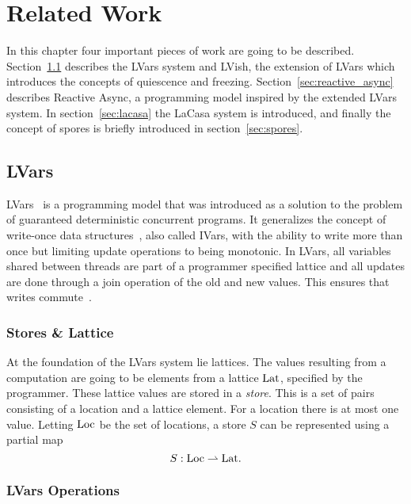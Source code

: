 \chapter{Related Work}\label{cha:related_work}

In this chapter four important pieces of work are going to be described.
Section~\ref{sec:lvars} describes the LVars system and LVish, the extension
of LVars which introduces the concepts of quiescence and freezing. 
Section~\ref{sec:reactive_async} describes Reactive Async, a programming model
inspired by the extended LVars system. In section~\ref{sec:lacasa} the LaCasa
system is introduced, and finally the concept of spores is briefly introduced in
section~\ref{sec:spores}.

\section{LVars}\label{sec:lvars}

LVars~\parencite{kuper2013lvars} is a programming model that was introduced as a
solution to the problem of guaranteed deterministic concurrent programs. It
generalizes the concept of write-once data
structures~\parencite{nikhil1989structures}, also called IVars, with the ability
to write more than once but limiting update operations to being monotonic.
In LVars, all variables shared between threads are part of a programmer
specified lattice and all updates are done through a join operation of the old
and new values. This ensures that writes commute~\parencite{kuper2013lvars}.

\subsection{Stores \& Lattice}%
\label{sub:stores_and_lattice}

At the foundation of the LVars system lie lattices. The values resulting from a
computation are going to be elements from a lattice $\mathrm{Lat}$, specified by the
programmer. These lattice values are stored in a \emph{store}.  This is a set of
pairs consisting of a location and a lattice element. For a location there is
at most one value. Letting $\mathrm{Loc}$ be the set of locations, a store $S$ can
be represented using a partial map
\begin{equation*}
  S: \mathrm{Loc} \rightharpoonup \mathrm{Lat}.
\end{equation*}

\subsection{LVars Operations}%
\label{sub:lvars_operations}

